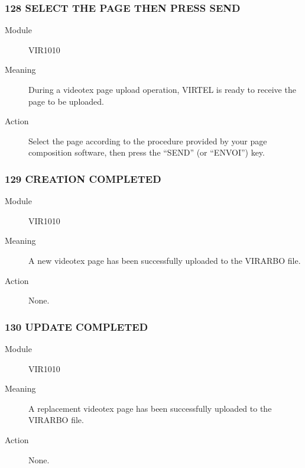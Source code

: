 \documentclass[letterpaper,10pt,english]{sphinxmanual}
\begin{document}
\subsubsection{128 SELECT THE PAGE THEN PRESS SEND}
\label{\detokenize{messages:select-the-page-then-press-send}}\begin{description}
\item[{Module}] \leavevmode
VIR1010

\item[{Meaning}] \leavevmode
During a videotex page upload operation, VIRTEL is ready to receive the page to be uploaded.

\item[{Action}] \leavevmode
Select the page according to the procedure provided by your page composition software, then press the “SEND” (or “ENVOI”) key.

\end{description}


\subsubsection{129 CREATION COMPLETED}
\label{\detokenize{messages:creation-completed}}\begin{description}
\item[{Module}] \leavevmode
VIR1010

\item[{Meaning}] \leavevmode
A new videotex page has been successfully uploaded to the VIRARBO file.

\item[{Action}] \leavevmode
None.

\end{description}


\subsubsection{130 UPDATE COMPLETED}
\label{\detokenize{messages:update-completed}}\begin{description}
\item[{Module}] \leavevmode
VIR1010

\item[{Meaning}] \leavevmode
A replacement videotex page has been successfully uploaded to the VIRARBO file.

\item[{Action}] \leavevmode
None.

\end{description}
\end{document}
